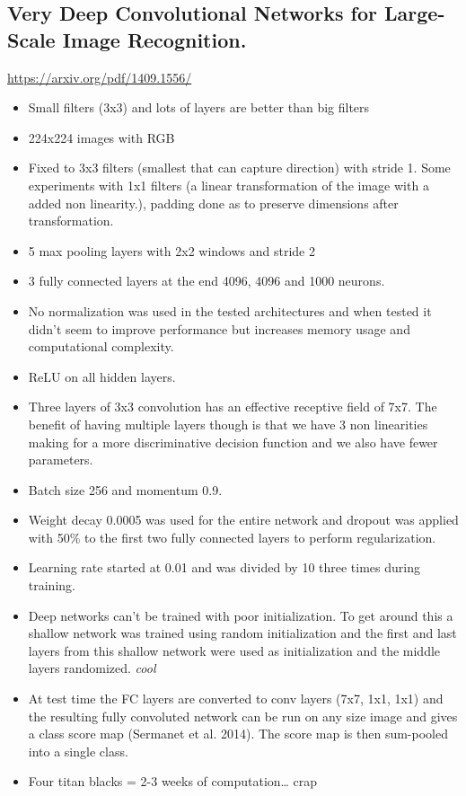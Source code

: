 \documentclass[11pt]{article}
\begin{document}
\subsection{Very Deep Convolutional Networks for Large-Scale Image Recognition.}
\label{sec:orgc314fc4}
\url{https://arxiv.org/pdf/1409.1556/}
\begin{itemize}
\item Small filters (3x3) and lots of layers are better than big filters
\item 224x224 images with RGB
\item Fixed to 3x3 filters (smallest that can capture direction) with stride 1. Some experiments with 1x1 filters (a linear transformation of the image with a added non linearity.), padding done as to preserve dimensions after transformation.
\item 5 max pooling layers with 2x2 windows and stride 2
\item 3 fully connected layers at the end 4096, 4096 and 1000 neurons.
\item No normalization was used in the tested architectures and when tested it didn't seem to improve performance but increases memory usage and computational complexity.
\item ReLU on all hidden layers.
\item Three layers of 3x3 convolution has an effective receptive field of 7x7. The benefit of having multiple layers though is that we have 3 non linearities making for a more discriminative decision function and we also have fewer parameters.
\item Batch size 256 and momentum 0.9.
\item Weight decay 0.0005 was used for the entire network and dropout was applied with 50\% to the first two fully connected layers to perform regularization.
\item Learning rate started at 0.01 and was divided by 10 three times during training.
\item Deep networks can't be trained with poor initialization. To get around this a shallow network was trained using random initialization and the first and last layers from this shallow network were used as initialization and the middle layers randomized. \emph{cool}
\item At test time the FC layers are converted to conv layers (7x7, 1x1, 1x1) and the resulting fully convoluted network can be run on any size image and gives a class score map (Sermanet et al. 2014). The score map is then sum-pooled into a single class.
\item Four titan blacks = 2-3 weeks of computation\ldots{} crap
\end{itemize}
\end{document}
